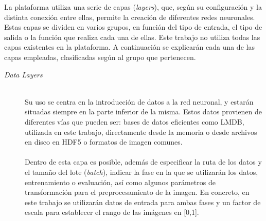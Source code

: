 La plataforma utiliza una serie de capas (\textit{layers}), que, según su configuración y la distinta conexión entre ellas, permite la creación de diferentes redes neuronales. Estas capas se dividen en varios grupos, en función del tipo de entrada, el tipo de salida o la función que realiza cada una de ellas. Este trabajo no utiliza todas las capas existentes en la plataforma. A continuación se explicarán cada una de las capas empleadas, clasificadas según al grupo que pertenecen.
\vspace{20pt}
\begin{description}
\item[\textit{Data Layers}] \hfill 
\vspace{10pt}
\\
	Su uso se centra en la introducción de datos a la red neuronal, y estarán situadas siempre en la parte inferior de la misma. Estos datos provienen de diferentes vías que pueden ser: bases de datos eficientes como LMDB, utilizada en este trabajo, directamente desde la memoria o desde archivos en disco en HDF5 o formatos de imagen comunes.\\
	\vspace{-10pt}
	\\
	Dentro de esta capa es posible, además de especificar la ruta de los datos y el tamaño del lote (\textit{batch}), indicar la fase en la que se utilizarán los datos, entrenamiento o evaluación, así como algunos parámetros de transformación para el preprocesamiento de la imagen. En concreto, en este trabajo se utilizarán datos de entrada para ambas fases y un factor de escala para establecer el rango de las imágenes en [0,1].
	\vspace{15pt}
	

\end{description}
